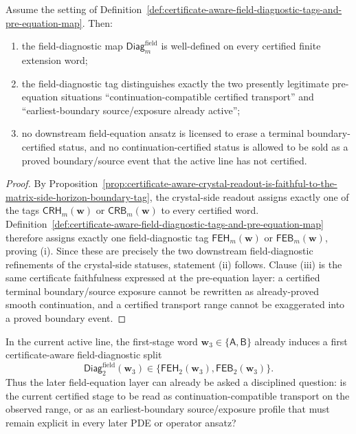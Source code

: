 \begin{proposition}
\label{prop:certificate-aware-field-diagnostics-are-faithful-to-the-crystal-side-tag}
Assume the setting of Definition~\ref{def:certificate-aware-field-diagnostic-tags-and-pre-equation-map}. Then:
\begin{enumerate}[label=(\roman*)]
 \item the field-diagnostic map \(\mathsf{Diag}^{\mathrm{field}}_{m}\) is well-defined on every certified finite extension word;
 \item the field-diagnostic tag distinguishes exactly the two presently legitimate pre-equation situations ``continuation-compatible certified transport'' and ``earliest-boundary source/exposure already active'';
 \item no downstream field-equation ansatz is licensed to erase a terminal boundary-certified status, and no continuation-certified status is allowed to be sold as a proved boundary/source event that the active line has not certified.
\end{enumerate}
\end{proposition}

\begin{proof}
By Proposition~\ref{prop:certificate-aware-crystal-readout-is-faithful-to-the-matrix-side-horizon-boundary-tag}, the crystal-side readout assigns exactly one of the tags \(\mathsf{CRH}_{m}(\mathbf w)\) or \(\mathsf{CRB}_{m}(\mathbf w)\) to every certified word. Definition~\ref{def:certificate-aware-field-diagnostic-tags-and-pre-equation-map} therefore assigns exactly one field-diagnostic tag \(\mathsf{FEH}_{m}(\mathbf w)\) or \(\mathsf{FEB}_{m}(\mathbf w)\), proving (i). Since these are precisely the two downstream field-diagnostic refinements of the crystal-side statuses, statement (ii) follows. Clause (iii) is the same certificate faithfulness expressed at the pre-equation layer: a certified terminal boundary/source exposure cannot be rewritten as already-proved smooth continuation, and a certified transport range cannot be exaggerated into a proved boundary event.
\end{proof}

\begin{corollary}
\label{cor:present-sigma3-package-already-induces-first-certificate-aware-field-diagnostic-split}
In the current active line, the first-stage word \(\mathbf w_3\in\{\mathsf A,\mathsf B\}\) already induces a first certificate-aware field-diagnostic split
\[
 \mathsf{Diag}^{\mathrm{field}}_{2}(\mathbf w_3)
 \in
 \{\mathsf{FEH}_{2}(\mathbf w_3),\mathsf{FEB}_{2}(\mathbf w_3)\}.
\]
Thus the later field-equation layer can already be asked a disciplined question: is the current certified stage to be read as continuation-compatible transport on the observed range, or as an earliest-boundary source/exposure profile that must remain explicit in every later PDE or operator ansatz?
\end{corollary}

